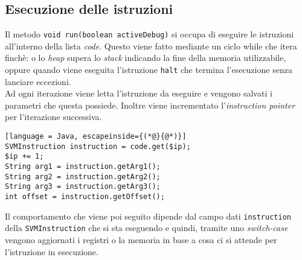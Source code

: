 \documentclass[../report.tex]{subfiles}
\begin{document}
\subsection{Esecuzione delle istruzioni}\label{ss:esecuzione-istruzioni}
Il metodo \verb|void run(boolean activeDebug)| si occupa di eseguire le istruzioni all'interno della lista \textit{code}. Questo viene fatto mediante un ciclo while che itera finch\`e: o lo \textit{heap} supera lo \textit{stack} indicando la fine della memoria utilizzabile, oppure quando viene eseguita l'istruzione \verb|halt| che termina l'esecuzione senza lanciare eccezioni.\\
Ad ogni iterazione viene letta l'istruzione da eseguire e vengono salvati i parametri che questa possiede. Inoltre viene incrementato l'\textit{instruction pointer} per l'iterazione successiva.
\begin{lstlisting}[language = Java, escapeinside={(*@}{@*)}]
SVMInstruction instruction = code.get($ip);
$ip += 1;
String arg1 = instruction.getArg1();
String arg2 = instruction.getArg2();
String arg3 = instruction.getArg3();
int offset = instruction.getOffset();
\end{lstlisting}
Il comportamento che viene poi seguito dipende dal campo dati \verb|instruction| della \verb|SVMInstruction| che si sta eseguendo e quindi, tramite uno \textit{switch-case} vengono aggiornati i registri o la memoria in base a cosa ci si attende per l'istruzione in esecuzione.
\end{document}
